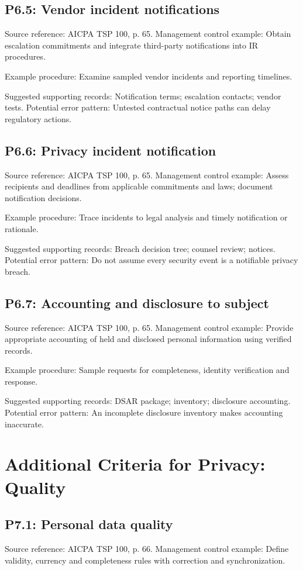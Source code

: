 \documentclass[10pt,oneside]{report}
\begin{document}
\subsection*{P6.5: Vendor incident notifications}
Source reference: AICPA TSP 100, p. 65. Management control example: Obtain escalation commitments and integrate third-party notifications into IR procedures.

Example procedure: Examine sampled vendor incidents and reporting timelines.

Suggested supporting records: Notification terms; escalation contacts; vendor tests. Potential error pattern: Untested contractual notice paths can delay regulatory actions.

\subsection*{P6.6: Privacy incident notification}
Source reference: AICPA TSP 100, p. 65. Management control example: Assess recipients and deadlines from applicable commitments and laws; document notification decisions.

Example procedure: Trace incidents to legal analysis and timely notification or rationale.

Suggested supporting records: Breach decision tree; counsel review; notices. Potential error pattern: Do not assume every security event is a notifiable privacy breach.

\subsection*{P6.7: Accounting and disclosure to subject}
Source reference: AICPA TSP 100, p. 65. Management control example: Provide appropriate accounting of held and disclosed personal information using verified records.

Example procedure: Sample requests for completeness, identity verification and response.

Suggested supporting records: DSAR package; inventory; disclosure accounting. Potential error pattern: An incomplete disclosure inventory makes accounting inaccurate.

\section{Additional Criteria for Privacy: Quality}
\subsection*{P7.1: Personal data quality}
Source reference: AICPA TSP 100, p. 66. Management control example: Define validity, currency and completeness rules with correction and synchronization.
\end{document}
